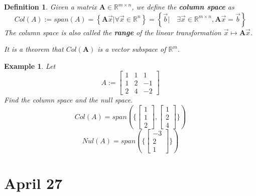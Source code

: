 \documentclass[11pt]{article}
\newtheorem{defn}{Definition}
\newtheorem{ex}{Example}
\begin{document}
\begin{defn}
  Given a matrix $\mathbf{A} \in \mathbb{R}^{m \times n}$, we define the \textbf{column space} as
  \[Col(A) := span(A) = \left\{\mathbf{A}\vec{x} | \forall \vec{x} \in \mathbb{R}^{n}\right\}=  \left\{\vec{b} | \quad  \exists \vec{x} \in \mathbb{R}^{m \times n}, \mathbf{A}\vec{x} = \vec{b}\right \}\]
  The column space is also called the \textbf{range} of the linear transformation $\vec{x} \mapsto \mathbf{A} \vec{x}$.

  It is a theorem that $Col(\mathbf{A})$ is a vector subspace of $\mathbb{R}^{m}$.
\end{defn}

\begin{ex}
  Let \[A := \begin{bmatrix} 1 & 1 & 1  \\ 1 & 2 & -1 \\ 2 & 4 & -2 \end{bmatrix}\]
  Find the column space and the null space.
  \[Col(A) = span(\{\begin{bmatrix} 1 \\ 1 \\ 2 \end{bmatrix} , \begin{bmatrix} 1 \\ 2 \\ 4 \end{bmatrix}\})\]
  \[Nul(A) = span(\{\begin{bmatrix} -3 \\ 2 \\ 1 \end{bmatrix}\})\]
\end{ex}
\section{April 27}
\end{document}
